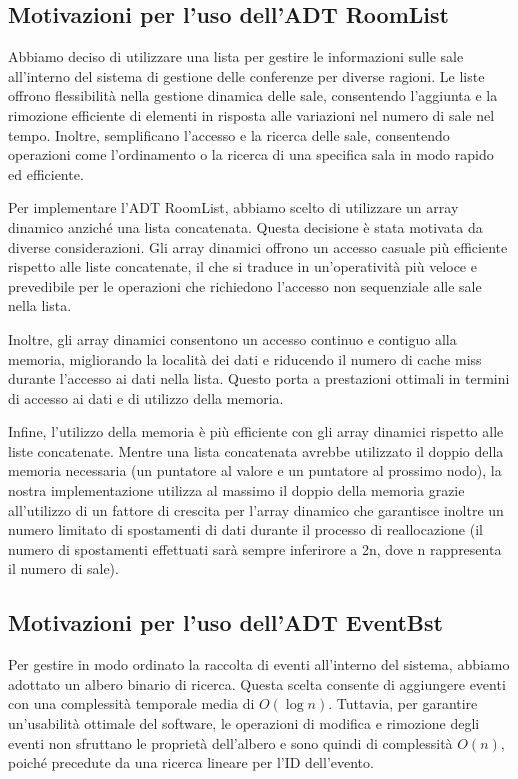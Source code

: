 \documentclass[11pt]{scrartcl} %
\begin{document}
\subsection{Motivazioni per l'uso dell'ADT RoomList}

Abbiamo deciso di utilizzare una lista per gestire le informazioni sulle sale all'interno del sistema di gestione delle conferenze per diverse ragioni. Le liste offrono flessibilità nella gestione dinamica delle sale, consentendo l'aggiunta e la rimozione efficiente di elementi in risposta alle variazioni nel numero di sale nel tempo. Inoltre, semplificano l'accesso e la ricerca delle sale, consentendo operazioni come l'ordinamento o la ricerca di una specifica sala in modo rapido ed efficiente.

Per implementare l'ADT RoomList, abbiamo scelto di utilizzare un array dinamico anziché una lista concatenata. Questa decisione è stata motivata da diverse considerazioni. Gli array dinamici offrono un accesso casuale più efficiente rispetto alle liste concatenate, il che si traduce in un'operatività più veloce e prevedibile per le operazioni che richiedono l'accesso non sequenziale alle sale nella lista.

Inoltre, gli array dinamici consentono un accesso continuo e contiguo alla memoria, migliorando la località dei dati e riducendo il numero di cache miss durante l'accesso ai dati nella lista. Questo porta a prestazioni ottimali in termini di accesso ai dati e di utilizzo della memoria.

Infine, l'utilizzo della memoria è più efficiente con gli array dinamici rispetto alle liste concatenate. Mentre una lista concatenata avrebbe utilizzato il doppio della memoria necessaria (un puntatore al valore e un puntatore al prossimo nodo), la nostra implementazione utilizza al massimo il doppio della memoria grazie all'utilizzo di un fattore di crescita per l'array dinamico che garantisce inoltre un numero limitato di spostamenti di dati durante il processo di reallocazione (il numero di spostamenti effettuati sarà sempre inferirore a 2n, dove n rappresenta il numero di sale).


\subsection{Motivazioni per l'uso dell'ADT EventBst}
Per gestire in modo ordinato la raccolta di eventi all'interno del sistema, abbiamo adottato un albero binario di ricerca. Questa scelta consente di aggiungere eventi con una complessità temporale media di \( O(\log{n}) \). Tuttavia, per garantire un'usabilità ottimale del software, le operazioni di modifica e rimozione degli eventi non sfruttano le proprietà dell'albero e sono quindi di complessità \( O(n) \), poiché precedute da una ricerca lineare per l'ID dell'evento.
\end{document}
